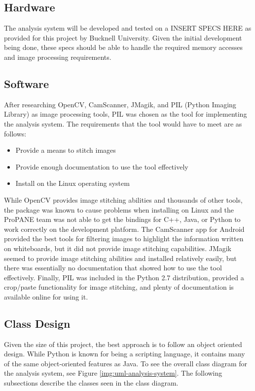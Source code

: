 \documentclass[]{article}
\begin{document}
		\subsection{Hardware}
			The analysis system will be developed and tested on a INSERT SPECS HERE as provided for this project by Bucknell University. Given the initial development being done, these specs should be able to handle the required memory accesses and image processing requirements.
			
		\subsection{Software}
			After researching OpenCV, CamScanner, JMagik, and PIL (Python Imaging Library) as image processing tools, PIL was chosen as the tool for implementing the analysis system. The requirements that the tool would have to meet are as follows:
			\begin{itemize}
				\item Provide a means to stitch images
				\item Provide enough documentation to use the tool effectively
				\item Install on the Linux operating system
			\end{itemize}
			
			While OpenCV provides image stitching abilities and thousands of other tools, the package was known to cause problems when installing on Linux and the ProPANE team was not able to get the bindings for C++, Java, or Python to work correctly on the development platform. The CamScanner app for Android provided the best tools for filtering images to highlight the information written on whiteboards, but it did not provide image stitching capabilities. JMagik seemed to provide image stitching abilities and installed relatively easily, but there was essentially no documentation that showed how to use the tool effectively. Finally, PIL was included in the Python 2.7 distribution, provided a crop/paste functionality for image stitching, and plenty of documentation is available online for using it. 
			
		\subsection{Class Design}
			Given the size of this project, the best approach is to follow an object oriented design. While Python is known for being a scripting language, it contains many of the same object-oriented features as Java. To see the overall class diagram for the analysis system, see Figure \ref{img:uml-analysis-system}. The following subsections describe the classes seen in the class diagram. 
			
\end{document}
